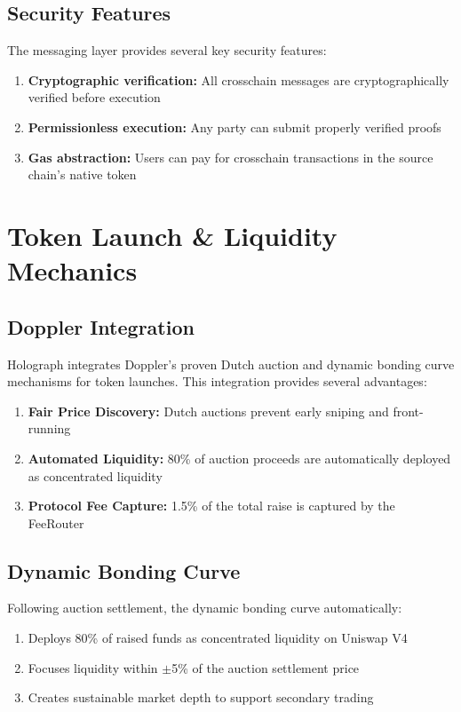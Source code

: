 \documentclass[10pt,a4paper,twocolumn]{article}
\begin{document}
\subsection{Security Features}
The messaging layer provides several key security features:
\begin{enumerate}
  \item \textbf{Cryptographic verification:} All crosschain messages are cryptographically verified before execution
  \item \textbf{Permissionless execution:} Any party can submit properly verified proofs
  \item \textbf{Gas abstraction:} Users can pay for crosschain transactions in the source chain's native token
\end{enumerate}

\section{Token Launch \& Liquidity Mechanics}

\subsection{Doppler Integration}
Holograph integrates Doppler's proven Dutch auction and dynamic bonding curve mechanisms for token launches. This integration provides several advantages:
\begin{enumerate}
  \item \textbf{Fair Price Discovery:} Dutch auctions prevent early sniping and front-running
  \item \textbf{Automated Liquidity:} 80\% of auction proceeds are automatically deployed as concentrated liquidity
  \item \textbf{Protocol Fee Capture:} 1.5\% of the total raise is captured by the FeeRouter
\end{enumerate}

\subsection{Dynamic Bonding Curve}
Following auction settlement, the dynamic bonding curve automatically:
\begin{enumerate}
  \item Deploys 80\% of raised funds as concentrated liquidity on Uniswap V4
  \item Focuses liquidity within \(\pm\)5\% of the auction settlement price
  \item Creates sustainable market depth to support secondary trading
\end{enumerate}
\end{document}
